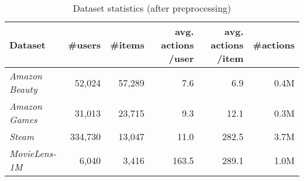 \documentclass[conference]{IEEEtran}
\begin{document}
\begin{table}[h]
\centering
\caption{Dataset statistics (after preprocessing) \label{exp:dataset}}
\label{tb:data}
\setlength{\tabcolsep}{5pt}
\begin{tabular}{lrrrrr}
\toprule
\multicolumn{1}{x{0.8cm}}{\newline Dataset} 				& \multicolumn{1}{x{0.8cm}}{\newline \#users} & \multicolumn{1}{x{0.8cm}}{\newline \#items} & \multicolumn{1}{x{0.8cm}}{avg. actions /user}&\multicolumn{1}{x{0.8cm}}{avg. actions /item} & \multicolumn{1}{x{0.8cm}}{\newline \#actions}\\ \midrule
\emph{Amazon Beauty} 	&  52,024  	&  57,289  & 7.6 	& 6.9	&   0.4M\\
\emph{Amazon Games}   	&  31,013  	&  23,715  & 9.3 	& 12.1  &   0.3M\\
\emph{Steam}     		&  334,730  &  13,047  & 11.0 	& 282.5	&	3.7M\\
\emph{MovieLens-1M}    	&  6,040 	&   3,416  & 163.5 & 289.1	&	1.0M\\ \bottomrule
\end{tabular}
\end{table}
\end{document}

